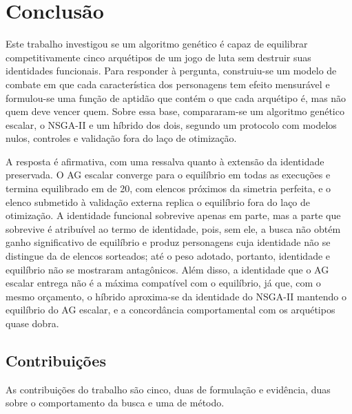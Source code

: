 \chapter[Conclusão]{Conclusão}
\label{chap: conclusao}

Este trabalho investigou se um algoritmo genético é capaz de equilibrar competitivamente cinco arquétipos de um jogo de luta sem destruir suas identidades funcionais. Para responder à pergunta, construiu-se um modelo de combate em que cada característica dos personagens tem efeito mensurável e formulou-se uma função de aptidão que contém o que cada arquétipo é, mas não quem deve vencer quem. Sobre essa base, compararam-se um algoritmo genético escalar, o NSGA-II e um híbrido dos dois, segundo um protocolo com modelos nulos, controles e validação fora do laço de otimização.

A resposta é afirmativa, com uma ressalva quanto à extensão da identidade preservada. O AG escalar converge para o equilíbrio em todas as execuções e termina equilibrado em \equilAG{} de 20, com elencos próximos da simetria perfeita, e o elenco submetido à validação externa replica o equilíbrio fora do laço de otimização. A identidade funcional sobrevive apenas em parte, mas a parte que sobrevive é atribuível ao termo de identidade, pois, sem ele, a busca não obtém ganho significativo de equilíbrio e produz personagens cuja identidade não se distingue da de elencos sorteados; até o peso adotado, portanto, identidade e equilíbrio não se mostraram antagônicos. Além disso, a identidade que o AG escalar entrega não é a máxima compatível com o equilíbrio, já que, com o mesmo orçamento, o híbrido aproxima-se da identidade do NSGA-II mantendo o equilíbrio do AG escalar, e a concordância comportamental com os arquétipos quase dobra.

\section{Contribuições}

As contribuições do trabalho são cinco, duas de formulação e evidência, duas sobre o comportamento da busca e uma de método.

